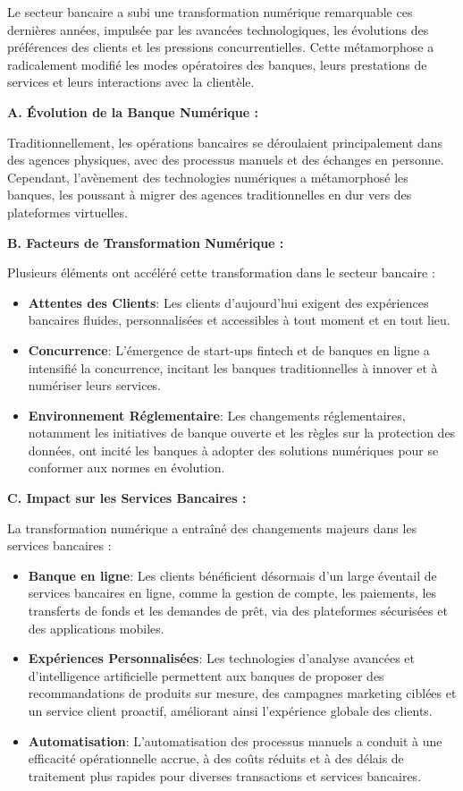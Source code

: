 \hspace{\parindent}Le secteur bancaire a subi une transformation numérique remarquable ces dernières années, impulsée par les avancées technologiques, les évolutions des préférences des clients et les pressions concurrentielles. Cette métamorphose a radicalement modifié les modes opératoires des banques, leurs prestations de services et leurs interactions avec la clientèle.

\textbf{A. Évolution de la Banque Numérique :}

Traditionnellement, les opérations bancaires se déroulaient principalement dans des agences physiques, avec des processus manuels et des échanges en personne. Cependant, l'avènement des technologies numériques a métamorphosé les banques, les poussant à migrer des agences traditionnelles en dur vers des plateformes virtuelles.


\textbf{B. Facteurs de Transformation Numérique :}

Plusieurs éléments ont accéléré cette transformation dans le secteur bancaire :
\begin{itemize}
\item \textbf{Attentes des Clients}: Les clients d'aujourd'hui exigent des expériences bancaires fluides, personnalisées et accessibles à tout moment et en tout lieu.
\item \textbf{Concurrence}: L'émergence de start-ups fintech et de banques en ligne a intensifié la concurrence, incitant les banques traditionnelles à innover et à numériser leurs services.
\item \textbf{Environnement Réglementaire}: Les changements réglementaires, notamment les initiatives de banque ouverte et les règles sur la protection des données, ont incité les banques à adopter des solutions numériques pour se conformer aux normes en évolution.
\end{itemize}


\textbf{C. Impact sur les Services Bancaires :}

La transformation numérique a entraîné des changements majeurs dans les services bancaires :
\begin{itemize}
\item \textbf{Banque en ligne}: Les clients bénéficient désormais d'un large éventail de services bancaires en ligne, comme la gestion de compte, les paiements, les transferts de fonds et les demandes de prêt, via des plateformes sécurisées et des applications mobiles.
\item \textbf{Expériences Personnalisées}: Les technologies d'analyse avancées et d'intelligence artificielle permettent aux banques de proposer des recommandations de produits sur mesure, des campagnes marketing ciblées et un service client proactif, améliorant ainsi l'expérience globale des clients.
\item \textbf{Automatisation}: L'automatisation des processus manuels a conduit à une efficacité opérationnelle accrue, à des coûts réduits et à des délais de traitement plus rapides pour diverses transactions et services bancaires.
\end{itemize}

